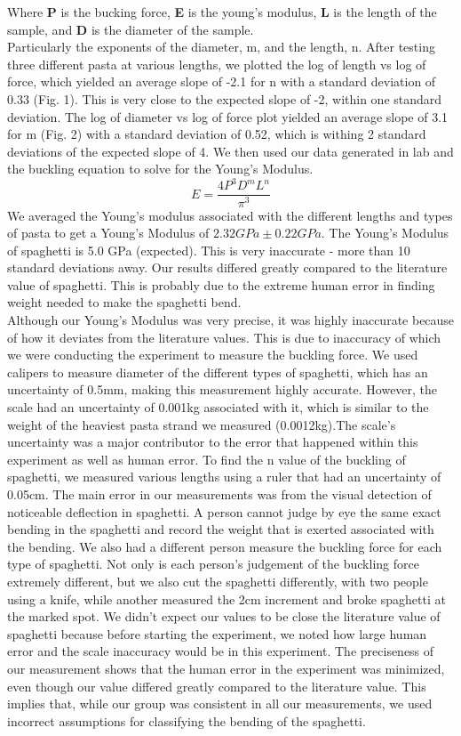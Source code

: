 \documentclass[12pt]{article}
\newcommand\tab[1][1.5cm]{\hspace*{#1}}
\begin{document}
Where \textbf{P} is the bucking force, \textbf{E} is the young's modulus, \textbf{L} is the length of the sample, and \textbf{D} is the diameter of the sample.\\
\tab Particularly the exponents of the diameter, m, and the length, n. After testing three different pasta at various lengths, we plotted the log of length vs log of force, which yielded an average slope of -2.1 for n with a standard deviation of 0.33 (Fig. 1). This is very close to the expected slope of -2, within one standard deviation. The log of diameter vs log of force plot yielded an average slope of 3.1 for m (Fig. 2) with a standard deviation of 0.52, which is withing 2 standard deviations of the expected slope of 4. We then used our data generated in lab and the buckling equation to solve for the Young's Modulus.
\begin{equation}
E=\frac{4P^3D^mL^n}{\pi ^3}
\end{equation}
\tab We averaged the Young's modulus associated with the different lengths and types of pasta to get a Young's Modulus of $2.32 GPa \pm 0.22 GPa$. The Young's Modulus of spaghetti is 5.0 GPa (expected). This is very inaccurate - more than 10 standard deviations away. Our results differed greatly compared to the literature value of spaghetti. This is probably due to the extreme human error in finding weight needed to make the spaghetti bend.\\
\tab Although our Young's Modulus was very precise, it was highly inaccurate because of how it deviates from the literature values. This is due to inaccuracy of which we were conducting the experiment to measure the buckling force. We used calipers to measure diameter of the different types of spaghetti, which has an uncertainty of 0.5mm, making this measurement highly accurate. However, the scale had an uncertainty of 0.001kg associated with it, which is similar to the weight of the heaviest pasta strand we measured (0.0012kg).The scale's uncertainty was a major contributor to the error that happened within this experiment as well as human error.  To find the n value of the buckling of spaghetti, we measured various lengths using a ruler that had an uncertainty of 0.05cm. The main error in our measurements was from the visual detection of noticeable deflection in spaghetti. A person cannot judge by eye the same exact bending in the spaghetti and record the weight that is exerted associated with the bending. We also had a different person measure the buckling force for each type of spaghetti. Not only is each person’s judgement of the buckling force extremely different, but we also cut the spaghetti differently, with two people using a knife, while another measured the 2cm increment and broke spaghetti at the marked spot. We didn't expect our values to be close the literature value of spaghetti because before starting the experiment, we noted how large human error and the scale inaccuracy would be in this experiment. The preciseness of our measurement shows that the human error in the experiment was minimized, even though our value differed greatly compared to the literature value. This implies that, while our group was consistent in all our measurements, we used incorrect assumptions for classifying the bending of the spaghetti.
\end{document}
